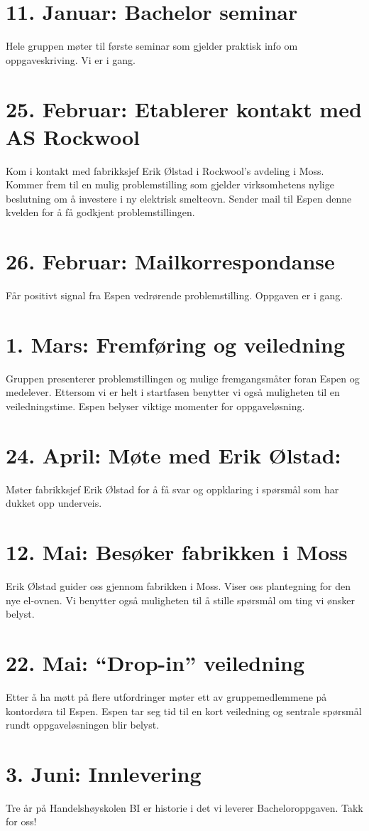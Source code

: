 
\section*{11. Januar: Bachelor seminar}
Hele gruppen møter til første seminar som gjelder praktisk info om oppgaveskriving. Vi er i gang. 

\section*{25. Februar: Etablerer kontakt med AS Rockwool}
Kom i kontakt med fabrikksjef Erik Ølstad i Rockwool’s avdeling i Moss. Kommer frem til en mulig problemstilling som gjelder virksomhetens nylige beslutning om å investere i ny elektrisk smelteovn. Sender mail til Espen denne kvelden for å få godkjent problemstillingen.

\section*{26. Februar: Mailkorrespondanse }
Får positivt signal fra Espen vedrørende problemstilling. Oppgaven er i gang.

\section*{1. Mars: Fremføring og veiledning}
Gruppen presenterer problemstillingen og mulige fremgangsmåter foran Espen og medelever. Ettersom vi er helt i startfasen benytter vi også muligheten til en veiledningstime. Espen belyser viktige momenter for oppgaveløsning.

\section*{24. April: Møte med Erik Ølstad:}
Møter fabrikksjef Erik Ølstad for å få svar og oppklaring i spørsmål som har dukket opp underveis. 

\section*{12. Mai: Besøker fabrikken i Moss}
Erik Ølstad guider oss gjennom fabrikken i Moss. Viser oss plantegning for den nye el-ovnen. Vi benytter også muligheten til å stille spørsmål om ting vi ønsker belyst. 

\section*{22. Mai: “Drop-in” veiledning} 
Etter å ha møtt på flere utfordringer møter ett av gruppemedlemmene på kontordøra til Espen. Espen tar seg tid til en kort veiledning og sentrale spørsmål rundt oppgaveløsningen blir belyst. 

\section*{3. Juni: Innlevering}
Tre år på Handelshøyskolen BI er historie i det vi leverer Bacheloroppgaven. Takk for oss!  
